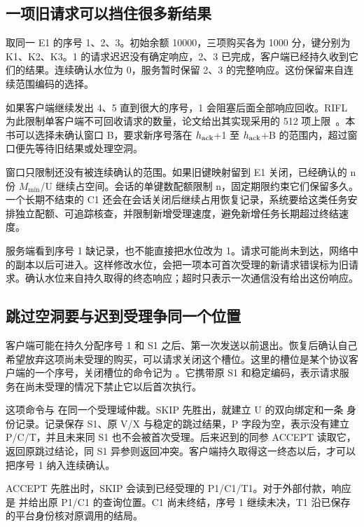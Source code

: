 \subsection*{一项旧请求可以挡住很多新结果}

取同一 E1 的序号 1、2、3。初始余额 10000，三项购买各为 1000 分，键分别为 K1、K2、K3。1 的请求迟迟没有确定响应，2、3 已完成，客户端已经持久收到它们的结果。连续确认水位为 0，服务暂时保留 2、3 的完整响应。这份保留来自连续范围编码的选择。

如果客户端继续发出 4、5 直到很大的序号，1 会阻塞后面全部响应回收。RIFL 为此限制单客户端不可回收请求的数量，论文给出其实现采用的 512 项上限~\cite{rifl}。本书可以选择未确认窗口 B，要求新序号落在 $h_{\rm ack}$+1 至 $h_{\rm ack}$+B 的范围内，超过窗口便先等待旧结果或处理空洞。

窗口只限制还没有被连续确认的范围。如果旧键映射留到 E1 关闭，已经确认的 n 份 $M_{\min}$/U 继续占空间。会话的单键数配额限制 n，固定期限约束它们保留多久。一个长期不结束的 C1 还会在会话关闭后继续占用恢复记录，系统要给这类任务安排独立配额、可追踪核查，并限制新增受理速度，避免新增任务长期超过终结速度。


服务端看到序号 1 缺记录，也不能直接把水位改为 1。请求可能尚未到达，网络中的副本以后可进入。这样修改水位，会把一项本可首次受理的新请求错误标为旧请求。确认水位来自持久取得的终态响应；超时只表示一次通信没有给出这份响应。

\subsection*{跳过空洞要与迟到受理争同一个位置}

客户端可能在持久分配序号 1 和 S1 之后、第一次发送以前退出。恢复后确认自己希望放弃这项尚未受理的购买，可以请求关闭这个槽位。这里的槽位是某个协议客户端的一个序号，关闭槽位的命令记为 。它携带原 S1 和稳定编码，表示请求服务在尚未受理的情况下禁止它以后首次执行。

这项命令与  在同一个受理域仲裁。SKIP 先胜出，就建立 U 的双向绑定和一条  身份记录。记录保存 S1、原 V/X 与稳定的跳过结果，P 字段为空，表示没有建立 P/C/T，并且未来同 S1 也不会被首次受理。后来迟到的同参 ACCEPT 读取它，返回原跳过结论，同 S1 异参则返回冲突。客户端持久取得这一终态以后，才可以把序号 1 纳入连续确认。

ACCEPT 先胜出时，SKIP 会读到已经受理的 P1/C1/T1。对于外部付款，响应是  并给出原 P1/C1 的查询位置。C1 尚未终结，序号 1 继续未决，T1 沿已保存的平台身份核对原调用的结局。

